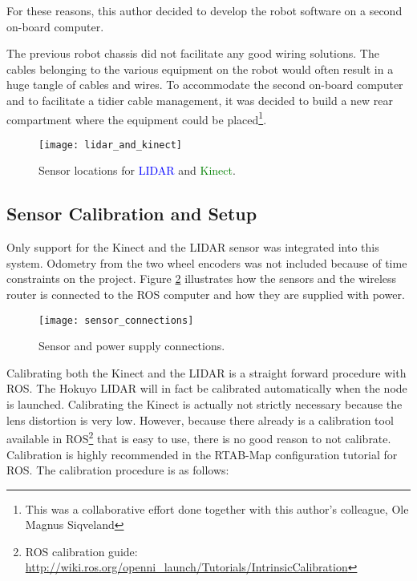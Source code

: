For these reasons, this author decided to develop the robot software on a second on-board computer. 

The previous robot chassis did not facilitate any good wiring solutions. The cables belonging to the various equipment on the robot would often result in a huge tangle of cables and wires. To accommodate the second on-board computer and to facilitate a tidier cable management, it was decided to build a new rear compartment where the equipment could be placed\footnote{This was a collaborative effort done together with this author's colleague, Ole Magnus Siqveland }.




\begin{figure}[H]
	\centering
	\texttt{[image: lidar\_and\_kinect]}
	\caption{Sensor locations for \textcolor{blue}{LIDAR} and \textcolor{green}{Kinect}. }
	\label{fig:kinect_and_lidar}
\end{figure}

\subsection{Sensor Calibration and Setup}

Only support for the Kinect and the \ac{LIDAR} sensor was integrated into this system. Odometry from the two wheel encoders was not included because of time constraints on the project. Figure \ref{fig:sensor_connections} illustrates how the sensors and the wireless router is connected to the \ac{ROS} computer and how they are supplied with power.

\begin{figure}[h]
	\centering
	\texttt{[image: sensor\_connections]}
	\caption{Sensor and power supply connections. }
	\label{fig:sensor_connections}
\end{figure}

Calibrating both the Kinect and the \ac{LIDAR} is a straight forward procedure with \ac{ROS}. The Hokuyo \ac{LIDAR} will in fact be calibrated automatically when the node is launched. Calibrating the Kinect is actually not strictly necessary because the lens distortion is very low. However, because there already is a calibration tool available in \ac{ROS}\footnote{ROS calibration guide: \url{http://wiki.ros.org/openni_launch/Tutorials/IntrinsicCalibration}} that is easy to use, there is no good reason to not calibrate. Calibration is highly recommended in the \ac{RTAB-Map} configuration tutorial for \ac{ROS}\cite{rtabmap_setup}. The calibration procedure is as follows:

